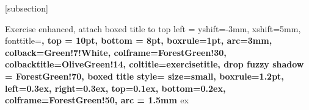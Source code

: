 
\newcommand{\equp}{\vspace{-\baselineskip}}

\newcommand{\exref}[1]{\hypersetup{linkcolor=exerciseref}\autoref{ex:#1}}
\newcommand{\defref}[1]{\hypersetup{linkcolor=red}\hyperref[def:#1]{#1}}

\newcommand{\hint}[1]{\textcolor{WildStrawberry}{\textsc{D\&F Hint.}}~\emph{#1}}
\newcommand{\note}[1]{\textcolor{Brown}{\textsc{D\&F Note.}}~\emph{#1}}
\newcommand{\mnote}[1]{\textcolor{RoyalBlue}{\textsc{Manual Note.}}~\emph{#1}}


[subsection]

\renewcommand{\theexercount}{\thesubsection.\arabic{exercount}}
\newcommand{\exercountautorefname}{Exercise}

\renewcommand{\subsectionautorefname}{Section}

    {Exercise}%
    {enhanced,%
    attach boxed title to top left = {yshift=-3mm, xshift=5mm},%
    fonttitle=\bfseries,%
    top = 10pt, bottom = 8pt,%
    boxrule=1pt,%
    arc=3mm,%
    colback=Green!7!White, colframe=ForestGreen!30,%
    colbacktitle=OliveGreen!14, coltitle=exercisetitle,%
    drop fuzzy shadow = ForestGreen!70,%
    boxed title style={%
        size=small,%
        boxrule=1.2pt,%
        left=0.3ex, right=0.3ex, top=0.1ex, bottom=0.2ex,%
        colframe=ForestGreen!50,%
        arc = 1.5mm%
    }%
}
{ex}

\newenvironment{exercise}[1][]{\begin{exer}{}{#1}}{\end{exer}}

\newenvironment{spex}[1][]{\begin{exer}%
    [title = Exercise~\theexercount,%
    drop fuzzy shadow = blue!20,%
    colback=RoyalBlue!8, colframe=CadetBlue!60,%
    colbacktitle=BlueViolet!15, coltitle=MidnightBlue,%
    boxed title style ={colframe=NavyBlue!70}]{}{#1}}
{\end{exer}}


